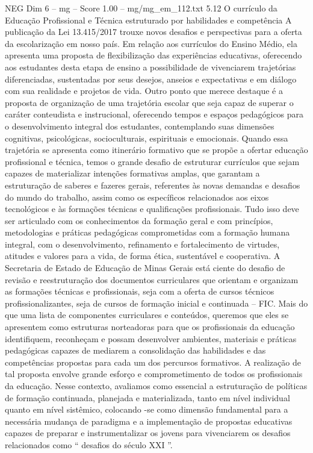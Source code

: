 \begin{textsample}{NEG Dim 6 – mg – Score 1.00 – mg/mg\_em\_112.txt}  \label{ex:f6_neg_043}
5.12 O currículo da Educação Profissional e Técnica estruturado por habilidades e competência A publicação da Lei 13.415/2017 trouxe novos desafios e perspectivas para a oferta da escolarização em nosso país.
Em relação aos currículos do Ensino Médio, ela apresenta uma proposta de flexibilização das experiências educativas, oferecendo aos estudantes desta etapa de ensino a possibilidade de vivenciarem trajetórias diferenciadas, sustentadas por seus desejos, anseios e expectativas e em diálogo com sua realidade e projetos de vida.
Outro ponto que merece destaque é a proposta de organização de uma trajetória escolar que seja capaz de superar o caráter conteudista e instrucional, oferecendo tempos e espaços pedagógicos para o desenvolvimento integral dos estudantes, contemplando suas dimensões cognitivas, psicológicas, socioculturais, espirituais e emocionais.
Quando essa trajetória se apresenta como itinerário formativo que se propõe a ofertar educação profissional e técnica, temos o grande desafio de estruturar currículos que sejam capazes de materializar intenções formativas amplas, que garantam a estruturação de saberes e fazeres gerais, referentes às novas demandas e desafios do mundo do trabalho, assim como os específicos relacionados aos eixos tecnológicos e às formações técnicas e qualificações profissionais.
Tudo isso deve ser articulado com os conhecimentos da formação geral e com princípios, metodologias e práticas pedagógicas comprometidas com a formação humana integral, com o desenvolvimento, refinamento e fortalecimento de virtudes, atitudes e valores para a vida, de forma ética, sustentável e cooperativa.
A Secretaria de Estado de Educação de Minas Gerais está ciente do desafio de revisão e reestruturação dos documentos curriculares que orientam e organizam as formações técnicas e profissionais, seja com a oferta de cursos técnicos profissionalizantes, seja de cursos de formação inicial e continuada – FIC.
Mais do que uma lista de componentes curriculares e conteúdos, queremos que eles se apresentem como estruturas norteadoras para que os profissionais da educação identifiquem, reconheçam e possam desenvolver ambientes, materiais e práticas pedagógicas capazes de mediarem a consolidação das habilidades e das competências propostas para cada um dos percursos formativos.
A realização de tal proposta envolve grande esforço e comprometimento de todos os profissionais da educação.
Nesse contexto, avaliamos como essencial a estruturação de políticas de formação continuada, planejada e materializada, tanto em nível individual quanto em nível sistêmico, colocando -se como dimensão fundamental para a necessária mudança de paradigma e a implementação de propostas educativas capazes de preparar e instrumentalizar os jovens para vivenciarem os desafios relacionados como “ desafios do século XXI ”.

\end{textsample}
